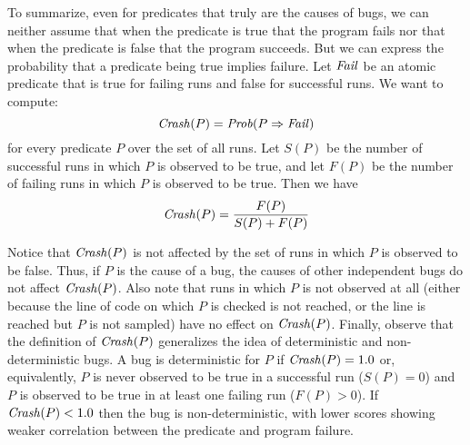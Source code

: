 
To summarize, even for predicates that truly are the causes of bugs, we can neither assume that
when the predicate is true that
the program fails nor that when the predicate is false that
the program succeeds. But we can express the probability that a predicate
being true implies failure.  Let $\mbox{\textit{Fail}}$ be an atomic predicate that is
true for failing runs and false for successful runs.  We want to compute:
\[ \mbox{\textit{Crash}}(P) = \mbox{\textit{Prob}}(P \Rightarrow \mbox{\textit{Fail}}) \]
for every predicate $P$ over the set of all runs.  Let $S(P)$ be the number
of successful runs in which $P$ is observed to be true, and let $F(P)$ be the number of
failing runs in which $P$ is observed to be true.  Then we have
\[ \mbox{\textit{Crash}}(P) = \frac{F(P)}{S(P) + F(P)} \]


Notice that $\mbox{\textit{Crash}}(P)$ is not affected by the set of runs in which
$P$ is observed to be false.  Thus, if $P$ is the cause of a bug, the
causes of other independent bugs do not affect $\mbox{\textit{Crash}}(P)$.
Also note that runs in which $P$ is not observed at all (either because
the line of code on which $P$ is checked is not reached, or the line is reached
but $P$ is not sampled) have no effect on $\mbox{\textit{Crash}}(P)$.
Finally, observe that the definition of $\mbox{\textit{Crash}}(P)$
generalizes the idea of deterministic and non-deterministic bugs.  A
bug is deterministic for $P$ if $\mbox{\textit{Crash}}(P) = 1.0$ or, equivalently,
$P$ is never observed to be true in a successful run ($S(P) =
0$) and $P$ is observed to be true in at least one failing run ($F(P) > 0$).
If $\mbox{\textit{Crash}}(P) < 1.0$ then the bug is non-deterministic, with
lower scores showing weaker correlation between the predicate and
program failure.

